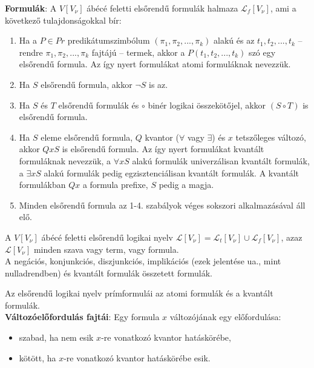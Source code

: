 \documentclass[margin=0px]{article}
\begin{document}
	\noindent \textbf{Formulák}: A $V[V_{\nu}]$ ábécé feletti elsőrendű formulák halmaza $\mathcal{L}_{f}[V_{\nu}]$, ami
	a következő tulajdonságokkal bír:
	
	\begin{enumerate}
		\item	Ha a $P \in Pr$ predikátumszimbólum $(\pi_{1}, \pi_{2}, ..., \pi_{k})$ alakú
		és az $t_{1}, t_{2}, ..., t_{k}$ -- rendre $\pi_{1}, \pi_{2}, ..., \pi_{k}$ fajtájú --
		termek, akkor a $P(t_{1}, t_{2}, ..., t_{k})$ szó egy elsőrendű formula.
		Az így nyert formulákat atomi formuláknak nevezzük.
		
		\item	Ha $S$ elsőrendű formula, akkor $\neg S$ is az.
		
		\item	Ha $S$ és $T$ elsőrendű formulák és $\circ$ binér logikai összekötőjel,
		akkor $(S \circ T)$ is elsőrendű formula.
		
		\item	Ha $S$ eleme elsőrendű formula, $Q$ kvantor ($\forall$ vagy $\exists$) és $x$
		tetszőleges változó, akkor $QxS$ is elsőrendű formula. Az így nyert formulákat kvantált formuláknak nevezzük,
		a $\forall xS$ alakú formulák univerzálisan kvantált formulák, a $\exists xS$ alakú formulák
		pedig egzisztenciálisan kvantált formulák. A kvantált formulákban $Qx$ a formula prefixe, $S$
		pedig a magja.
		
		\item	Minden elsőrendű formula az 1-4. szabályok véges sokszori alkalmazásával áll elő.
	\end{enumerate}
	
	\noindent A $V[V_{\nu}]$ ábécé feletti elsőrendű logikai nyelv
	$\mathcal{L}[V_{\nu}] = \mathcal{L}_{t}[V_{\nu}] \cup \mathcal{L}_{f}[V_{\nu}]$, azaz $\mathcal{L}[V_{\nu}]$
	minden szava vagy term, vagy formula.\\
	
	A negációs, konjunkciós, diszjunkciós, implikációs (ezek jelentése ua., mint nulladrendben) és kvantált formulák
	összetett formulák.
	
	Az elsőrendű logikai nyelv prímformulái az atomi formulák és a kvantált formulák.\\
	
	\noindent \textbf{Változóelőfordulás fajtái}: Egy formula $x$ változójának egy előfordulása:
	
	\begin{itemize}
		\item	szabad, ha nem esik $x$-re vonatkozó kvantor hatáskörébe,
		
		\item	kötött, ha $x$-re vonatkozó kvantor hatáskörébe esik. 
	\end{itemize}
	
\end{document}
